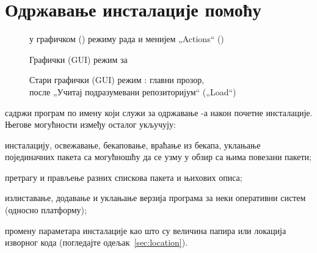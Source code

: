 \documentclass{article}
\begin{document}
%
%


\section{Одржавање инсталације помоћу }
\label{sec:tlmgr}

\begin{figure}[tb]
\begin{center}
  \caption{ у графичком (\GUI) режиму рада и менијем „Actions“ (\MacOSX)}
\label{fig:tlshell}
\end{center}
\end{figure}

\begin{figure}[tb]
\caption{Графички (GUI) режим  за }
\label{fig:tlcockpit}
\end{figure}

\begin{figure}[tb]
\caption{Стари графички (GUI) режим : главни прозор,\\ 
  после „Учитај подразумевани репозиторијум“ („Load“)}
\label{fig:tlmgr-gui}
\end{figure}


\TL{} садржи програм по имену  који служи за одржавање
\TL{}-а након почетне инсталације. Његове могућности између осталог
укључују:

\begin{itemize*}
\item инсталацију, освежавање, бекаповање, враћање из бекапа,
  уклањање појединачних пакета са могућношћу да се узму у обзир са њима
  повезани пакети;
\item претрагу и прављење разних спискова пакета и њихових описа;
\item излиставање, додавање и уклањање верзија програма за неки
  оперативни систем (односно платформу);
\item промену параметара инсталације као што су величина папира или
  локација изворног кода (погледајте одељак~\ref{sec:location}).
\end{itemize*}
\end{document}
